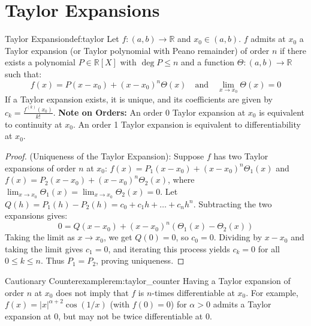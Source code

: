 \documentclass[11pt, a4paper]{article}
\begin{document}
\section{Taylor Expansions}

\begin{definition}{Taylor Expansion}{def:taylor}
Let $f: (a,b) \to \mathbb{R}$ and $x_0 \in (a,b)$. $f$ admits at $x_0$ a Taylor expansion (or Taylor polynomial with Peano remainder) of order $n$ if there exists a polynomial $P \in \mathbb{R}[X]$ with $\deg P \le n$ and a function $\Theta: (a,b) \to \mathbb{R}$ such that:
$$ f(x) = P(x-x_0) + (x-x_0)^n \Theta(x) \quad \text{and} \quad \lim_{x \to x_0} \Theta(x) = 0 $$
If a Taylor expansion exists, it is unique, and its coefficients are given by $c_k = \frac{f^{(k)}(x_0)}{k!}$.
\textbf{Note on Orders:} An order 0 Taylor expansion at $x_0$ is equivalent to continuity at $x_0$. An order 1 Taylor expansion is equivalent to differentiability at $x_0$.
\end{definition}
\begin{proof}
(Uniqueness of the Taylor Expansion): Suppose $f$ has two Taylor expansions of order $n$ at $x_0$:
$f(x) = P_1(x-x_0) + (x-x_0)^n \Theta_1(x)$ and $f(x) = P_2(x-x_0) + (x-x_0)^n \Theta_2(x)$, where $\lim_{x \to x_0} \Theta_1(x) = \lim_{x \to x_0} \Theta_2(x) = 0$.
Let $Q(h) = P_1(h) - P_2(h) = c_0 + c_1 h + \dots + c_n h^n$. 
Subtracting the two expansions gives:
$$ 0 = Q(x-x_0) + (x-x_0)^n (\Theta_1(x) - \Theta_2(x)) $$
Taking the limit as $x \to x_0$, we get $Q(0) = 0$, so $c_0 = 0$.
Dividing by $x-x_0$ and taking the limit gives $c_1 = 0$, and iterating this process yields $c_k = 0$ for all $0 \le k \le n$. Thus $P_1 = P_2$, proving uniqueness.
\end{proof}

\begin{remark}{Cautionary Counterexample}{rem:taylor_counter}
Having a Taylor expansion of order $n$ at $x_0$ does not imply that $f$ is $n$-times differentiable at $x_0$. For example, $f(x) = |x|^{\alpha+2} \cos(1/x)$ (with $f(0)=0$) for $\alpha > 0$ admits a Taylor expansion at 0, but may not be twice differentiable at 0.
\end{remark}
\end{document}
